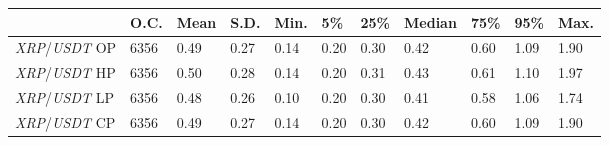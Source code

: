 \begin{tabular}{lllllllllll}
\toprule
 & \textbf{O.C.} & \textbf{Mean} & \textbf{S.D.} & \textbf{Min.} & \textbf{5\%} & \textbf{25\%} & \textbf{Median} & \textbf{75\%} & \textbf{95\%} & \textbf{Max.} \\
\midrule
\emph{XRP}/\emph{USDT} OP & 6356 & 0.49 & 0.27 & 0.14 & 0.20 & 0.30 & 0.42 & 0.60 & 1.09 & 1.90 \\
\emph{XRP}/\emph{USDT} HP & 6356 & 0.50 & 0.28 & 0.14 & 0.20 & 0.31 & 0.43 & 0.61 & 1.10 & 1.97 \\
\emph{XRP}/\emph{USDT} LP & 6356 & 0.48 & 0.26 & 0.10 & 0.20 & 0.30 & 0.41 & 0.58 & 1.06 & 1.74 \\
\emph{XRP}/\emph{USDT} CP & 6356 & 0.49 & 0.27 & 0.14 & 0.20 & 0.30 & 0.42 & 0.60 & 1.09 & 1.90 \\
\bottomrule
\end{tabular}
